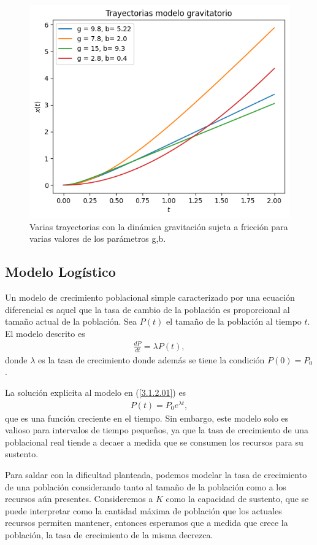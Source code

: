 \begin{figure}
    \centering
    \includegraphics[width = 10 cm]{img/Trayectoria.png}
    \caption{Varias trayectorias con la dinámica gravitación sujeta a fricción para varias valores de los parámetros g,b.}
    \label{fig:trayectoria_gravedad}
\end{figure}

\subsection{Modelo Logístico}

Un modelo de crecimiento poblacional simple caracterizado por una ecuación diferencial es aquel que la tasa de cambio de la población es proporcional al tamaño actual de la población. Sea $P(t)$ el tamaño de la población al tiempo $t$. El modelo descrito es 
\begin{align}
    \frac{dP}{dt} = \lambda P(t),
    \label{3.1.2.01}
\end{align}
donde $\lambda$ es la tasa de crecimiento donde además se tiene la condición $P(0) = P_0$. 

La solución explicita al modelo en (\ref{3.1.2.01}) es
\begin{align*}
    P(t) = P_0 e^{\lambda t },
\end{align*}
que es una función creciente en el tiempo. Sin embargo, este modelo solo es valioso para intervalos de tiempo pequeños, ya que la tasa de crecimiento de una poblacional real tiende a decaer a medida que se consumen los recursos para su sustento.

Para saldar con la dificultad planteada, podemos modelar la tasa de crecimiento de una población considerando tanto al tamaño de la población como a los recursos aún presentes. Consideremos a $K$ como la capacidad de sustento, que se puede interpretar como la cantidad máxima de población que los actuales recursos permiten mantener, entonces esperamos que a medida que crece la población, la tasa de crecimiento de la misma decrezca.

